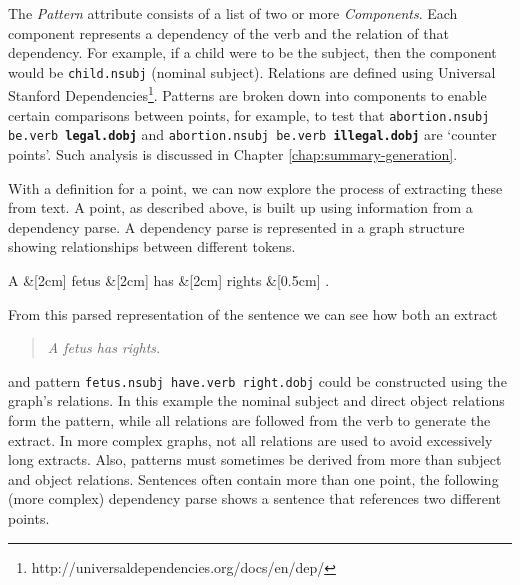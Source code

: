     The \textit{Pattern} attribute consists of a list of two or more \textit{Components}. Each component represents a dependency of the verb and the relation of that dependency. For example, if a child were to be the subject, then the component would be \texttt{child.nsubj} (nominal subject). Relations are defined using Universal Stanford Dependencies\footnote{http://universaldependencies.org/docs/en/dep/}. Patterns are broken down into components to enable certain comparisons between points, for example, to test that \texttt{abortion.nsubj be.verb \textbf{legal.dobj}} and \texttt{abortion.nsubj be.verb \textbf{illegal.dobj}} are `counter points'. Such analysis is discussed in Chapter \ref{chap:summary-generation}.

    With a definition for a point, we can now explore the process of extracting these from text. A point, as described above, is built up using information from a dependency parse. A dependency parse is represented in a graph structure showing relationships between different tokens.

	\begin{center}
      \begin{dependency}[edge horizontal padding=0]
          \begin{deptext}
              A \&[2cm] fetus \&[2cm] has \&[2cm] rights \&[0.5cm] . \\
          \end{deptext}
      \end{dependency}
	\end{center}
    \vspace{-7mm}

    From this parsed representation of the sentence we can see how both an extract \blockquote{\textit{A fetus has rights.}} and pattern \texttt{fetus.nsubj have.verb right.dobj} could be constructed using the graph's relations. In this example the nominal subject and direct object relations form the pattern, while all relations are followed from the verb to generate the extract. In more complex graphs, not all relations are used to avoid excessively long extracts. Also, patterns must sometimes be derived from more than subject and object relations. Sentences often contain more than one point, the following (more complex) dependency parse shows a sentence that references two different points.

